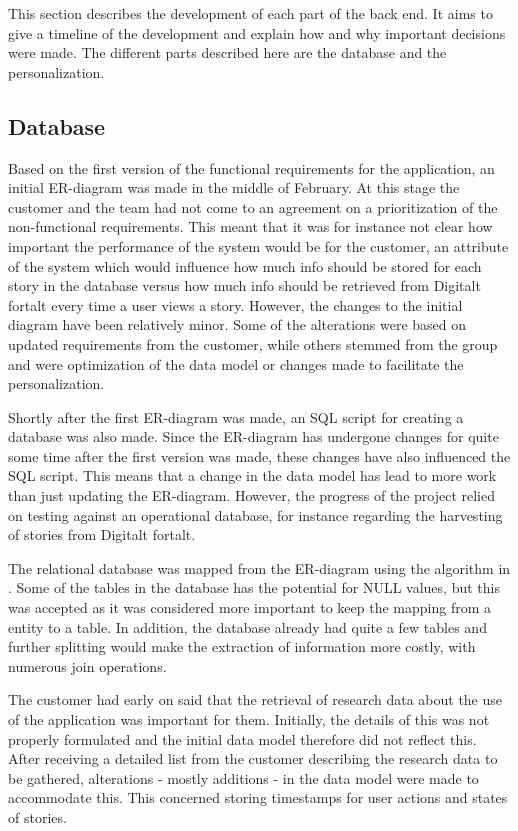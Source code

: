 This section describes the development of each part of the back end. It aims to give a timeline of the development and explain how and why important decisions were made. The different parts described here are the database and the personalization.  

\subsection{Database}

Based on the first version of the functional requirements for the application, an initial ER-diagram was made in the middle of February. At this stage the customer and the team had not come to an agreement on a prioritization of the non-functional requirements. This meant that it was for instance not clear how important the performance of the system would be for the customer, an attribute of the system which would influence how much info should be stored for each story in the database versus how much info should be retrieved from Digitalt fortalt every time a user views a story. However, the changes to the initial diagram have been relatively minor. Some of the alterations were based on updated requirements from the customer, while others stemmed from the group and were optimization of the data model or changes made to facilitate the personalization. \newline

Shortly after the first ER-diagram was made, an SQL script for creating a database was also made. Since the ER-diagram has undergone changes for quite some time after the first version was made, these changes have also influenced the SQL script. This means that a change in the data model has lead to more work than just updating the ER-diagram. However, the progress of the project relied on testing against an operational database, for instance regarding the harvesting of stories from Digitalt fortalt. \newline

The relational database was mapped from the ER-diagram using the algorithm in \cite[p.270-278]{AS2}. Some of the tables in the database has the potential for NULL values, but this was accepted as it was considered more important to keep the mapping from a entity to a table. In addition, the database already had quite a few tables and further splitting would make the extraction of information more costly, with numerous join operations. \newline 

The customer had early on said that the retrieval of research data about the use of the application was important for them. Initially, the details of this was not properly formulated and the initial data model therefore did not reflect this. After receiving a detailed list from the customer describing the research data to be gathered, alterations - mostly additions - in the data model were made to accommodate this. This concerned storing timestamps for user actions and states of stories.  \newline


